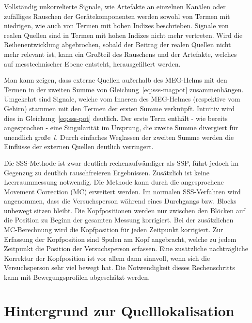 \documentclass[doc,a4paper,12pt]{apa6}
\begin{document}
\begin{compactitem}
\item Vollständig unkorrelierte Signale, wie Artefakte an einzelnen Kanälen oder zufälliges Rauschen der Gerätekomponenten werden sowohl von Termen mit niedrigen, wie auch von Termen mit hohen Indizes beschrieben. Signale von realen Quellen sind in Termen mit hohen Indizes nicht mehr vertreten. Wird die Reihenentwicklung abgebrochen, sobald der Beitrag der realen Quellen nicht mehr relevant ist, kann ein Großteil des Rauschens und der Artefakte, welches auf messtechnischer Ebene entsteht, herausgefiltert werden.
\item Man kann zeigen, dass externe Quellen außerhalb des MEG-Helms mit den Termen in der zweiten Summe von Gleichung~\ref{eq:sss-magpot} zusammenhängen. Umgekehrt sind Signale, welche vom Inneren des MEG-Helmes (respektive vom Gehirn) stammen mit den Termen der ersten Summe verknüpft. Intuitiv wird dies in Gleichung~\ref{eq:sss-pot} deutlich. Der erste Term enthält - wie bereits angesprochen - eine Singularität im Ursprung, die zweite Summe divergiert für unendlich große~$l$. Durch einfaches Weglassen der zweiten Summe werden die Einflüsse der externen Quellen deutlich verringert.
\end{compactitem}

Die SSS-Methode ist zwar deutlich rechenaufwändiger als SSP, führt jedoch im Gegenzug zu deutlich rauschfreieren Ergebnissen. Zusätzlich ist keine Leerraummessung notwendig. Die Methode kann durch die angesprochene Movement Correction (MC) erweitert werden. Im normalen SSS-Verfahren wird angenommen, dass die Versuchsperson während eines Durchgangs bzw. Blocks unbewegt sitzen bleibt. Die Kopfpositionen werden nur zwischen den Blöcken auf die Position zu Beginn der gesamten Messung korrigiert. Bei der zusätzlichen MC-Berechnung wird die Kopfposition für jeden Zeitpunkt korrigiert. Zur Erfassung der Kopfposition sind Spulen am Kopf angebracht, welche zu jedem Zeitpunkt die Position der Versuchsperson erfassen. Eine zusätzliche nachträgliche Korrektur der Kopfposition ist vor allem dann sinnvoll, wenn sich die Versuchsperson sehr viel bewegt hat. Die Notwendigkeit dieses Rechenschritts kann mit Bewegungsprofilen abgeschätzt werden.


\newpage
\section{Hintergrund zur Quelllokalisation}
\label{sec:hinter}
\end{document}

